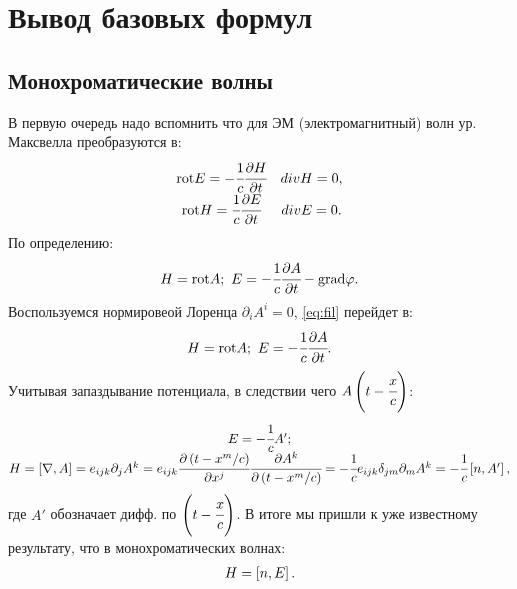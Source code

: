 \section{Вывод базовых формул}
\subsection{Монохроматические волны}
В первую очередь надо вспомнить что для ЭМ (электромагнитный) волн 
ур. Максвелла преобразуются в:
\begin{gather}
    \begin{matrix}
        \text{rot} E = -\cfrac{1}{c} \cfrac{\partial H}{\partial t} & div H = 0, \\
        \text{rot} H = \cfrac{1}{c} \cfrac{\partial E}{\partial t} & div E = 0.
    \end{matrix}
\end{gather} 
По определению:
\begin{eqnarray}
    H = \rot A; \ 
    E = -\cfrac{1}{c}\cfrac{\partial A}{\partial t} - \grad \phi .
    \label{eq:fil}
\end{eqnarray} 
Воспользуемся нормировеой Лоренца $\partial_i A^i = 0$, \ref{eq:fil} перейдет в:
\begin{eqnarray}
    H = \text{rot} A; \ E = -\cfrac{1}{c}\cfrac{\partial A}{\partial t}.
\end{eqnarray} 
Учитывая запаздывание потенциала, в следствии чего $A\left( t - \cfrac{x}{c} \right)$:
\begin{gather}
    \begin{matrix}
    E = -\cfrac{1}{c} A' ; \\ 
    H = \left[ \nabla, A \right] = e_{ijk} \partial_j A^k = 
    e_{ijk} \cfrac{\partial \left( t - x^m /c \right)}{\partial x^j}  
    \cfrac{\partial A^k}{\partial \left( t - x^m /c \right)} =
    -\cfrac{1}{c}e_{ijk} \delta_{jm} \partial_{m} A^k = 
    -\cfrac{1}{c}\left[ n, A' \right],
    \end{matrix}
\end{gather}
где $A'$ обозначает дифф. по $\left( t - \cfrac{x}{c} \right)$. 
В итоге мы пришли к уже известному результату, что в 
монохроматических волнах:
\begin{eqnarray}
    H = \left[ n, E \right].
\end{eqnarray} 

